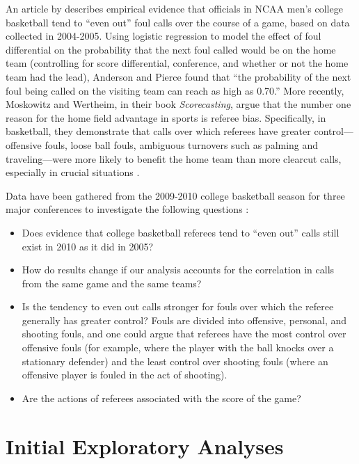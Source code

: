 \documentclass[
]{krantz}
\providecommand{\tightlist}{%
  \setlength{\itemsep}{0pt}\setlength{\parskip}{0pt}}
\begin{document}
An article by \citet{Anderson2009} describes empirical evidence that officials in NCAA men's college basketball tend to ``even out'' foul calls over the course of a game, based on data collected in 2004-2005. Using logistic regression to model the effect of foul differential on the probability that the next foul called would be on the home team (controlling for score differential, conference, and whether or not the home team had the lead), Anderson and Pierce found that ``the probability of the next foul being called on the visiting team can reach as high as 0.70.'' More recently, Moskowitz and Wertheim, in their book \emph{Scorecasting}, argue that the number one reason for the home field advantage in sports is referee bias. Specifically, in basketball, they demonstrate that calls over which referees have greater control---offensive fouls, loose ball fouls, ambiguous turnovers such as palming and traveling---were more likely to benefit the home team than more clearcut calls, especially in crucial situations \citep{Moskowitz2011}.

Data have been gathered from the 2009-2010 college basketball season for three major conferences to investigate the following questions \citep{Noecker2012}:

\begin{itemize}
\tightlist
\item
  Does evidence that college basketball referees tend to ``even out'' calls still exist in 2010 as it did in 2005?
\item
  How do results change if our analysis accounts for the correlation in calls from the same game and the same teams?
\item
  Is the tendency to even out calls stronger for fouls over which the referee generally has greater control? Fouls are divided into offensive, personal, and shooting fouls, and one could argue that referees have the most control over offensive fouls (for example, where the player with the ball knocks over a stationary defender) and the least control over shooting fouls (where an offensive player is fouled in the act of shooting).
\item
  Are the actions of referees associated with the score of the game?
\end{itemize}

\section{Initial Exploratory Analyses}\label{explore-glmm}
\end{document}
